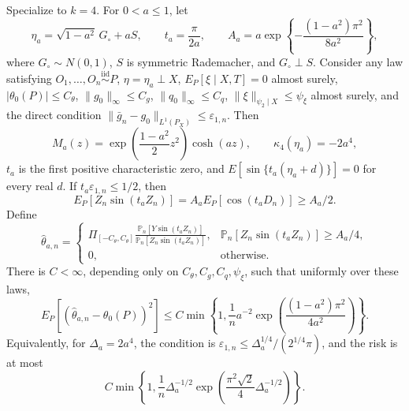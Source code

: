 Specialize to \(k=4\).  For \(0<a\le1\), let
\[
 \eta_a=\sqrt{1-a^2}\,G_{\circ}+aS,
 \qquad
 t_a=\frac{\pi}{2a},
 \qquad
 A_a=a\exp\!\left\{-\frac{(1-a^2)\pi^2}{8a^2}\right\},
\]
where \(G_{\circ}\sim N(0,1)\), \(S\) is symmetric Rademacher, and \(G_{\circ}\perp S\).  Consider any law satisfying \(O_1,\ldots,O_n\stackrel{\mathrm{iid}}{\sim}P\), \(\eta=\eta_a\perp X\), \(E_P[\xi\mid X,T]=0\) almost surely, \(\lvert\theta_0(P)\rvert\le C_{\theta}\), \(\lVert g_0\rVert_{\infty}\le C_g\), \(\lVert q_0\rVert_{\infty}\le C_q\), \(\lVert\xi\rVert_{\psi_2\mid X}\le\psi_{\xi}\) almost surely, and the direct condition \(\lVert\bar g_n-g_0\rVert_{L^1(P_X)}\le\varepsilon_{1,n}\).  Then
\[
 M_a(z)=\exp\!\left(\frac{1-a^2}{2}z^2\right)\cosh(az),
 \qquad
 \kappa_4(\eta_a)=-2a^4,
\]
\(t_a\) is the first positive characteristic zero, and \(E[\sin\{t_a(\eta_a+d)\}]=0\) for every real \(d\).  If \(t_a\varepsilon_{1,n}\le1/2\), then
\[
 E_P[Z_n\sin(t_aZ_n)]
 =A_aE_P[\cos(t_aD_n)]
 \ge A_a/2.
\]
Define
\[
 \widehat\theta_{a,n}
 =
 \begin{cases}
 \displaystyle
 \Pi_{[-C_{\theta},C_{\theta}]}
 \frac{\mathbb P_n[Y\sin(t_aZ_n)]}
      {\mathbb P_n[Z_n\sin(t_aZ_n)]},
 &\displaystyle \mathbb P_n[Z_n\sin(t_aZ_n)]\ge A_a/4,\\[3mm]
 0,&\text{otherwise}.
 \end{cases}
\]
There is \(C<\infty\), depending only on \(C_{\theta},C_g,C_q,\psi_{\xi}\), such that uniformly over these laws,
\[
 E_P[(\widehat\theta_{a,n}-\theta_0(P))^2]
 \le C\min\!\left\{1,\frac1n a^{-2}
 \exp\!\left(\frac{(1-a^2)\pi^2}{4a^2}\right)\right\}.
\]
Equivalently, for \(\Delta_a=2a^4\), the condition is \(\varepsilon_{1,n}\le\Delta_a^{1/4}/(2^{1/4}\pi)\), and the risk is at most
\[
 C\min\!\left\{1,\frac1n\Delta_a^{-1/2}
 \exp\!\left(\frac{\pi^2\sqrt2}{4}\Delta_a^{-1/2}\right)\right\}.
\]